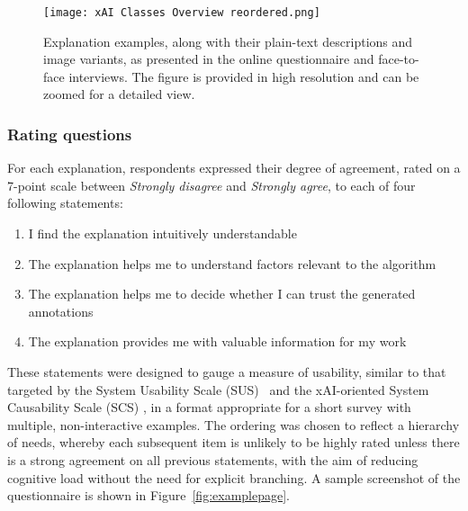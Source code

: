 \documentclass[final,5p,times,twocolumn,hyphens]{elsarticle}
\begin{document}
\begin{figure}
\centering
\begin{minipage}[c]{0.85\textwidth}
    \texttt{[image: xAI Classes Overview reordered.png]}
    \caption{Explanation examples, along with their plain-text descriptions and image variants, as presented in the online questionnaire and face-to-face interviews. The figure is provided in high resolution and can be zoomed for a detailed view.}
    \label{fig:classes_overview}
\end{minipage}
\end{figure}

\subsubsection{Rating questions}
 For each explanation, respondents expressed their degree of agreement, rated on a 7-point scale between \textit{Strongly disagree} and \textit{Strongly agree}, to each of four following statements:

 \begin{enumerate}
    \item I find the explanation intuitively understandable
    \item The explanation helps me to understand factors relevant to the algorithm
    \item The explanation helps me to decide whether I can trust the generated annotations
    \item The explanation provides me with valuable information for my work
\end{enumerate}

These statements were designed to gauge a measure of usability, similar to that targeted by the System Usability Scale (SUS)~\cite{brooke1996sus} and the xAI-oriented System Causability Scale (SCS) \cite{HolzingerEtAl:2020:QualityOfExplanations}, in a format appropriate for a short survey with multiple, non-interactive examples. The ordering was chosen to reflect a hierarchy of needs, whereby each subsequent item is unlikely to be highly rated unless there is a strong agreement on all previous statements, with the aim of reducing cognitive load without the need for explicit branching. A sample screenshot of the questionnaire is shown in Figure~\ref{fig:examplepage}.
\end{document}
